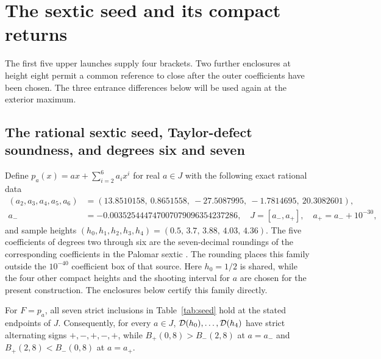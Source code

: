 \section{The sextic seed and its compact returns}\label{sec:deg12}

The first five upper launches supply four brackets. Two further enclosures at height eight permit a common reference to close after the outer coefficients have been chosen. The three entrance differences below will be used again at the exterior maximum.

\subsection{The rational sextic seed, Taylor-defect soundness, and degrees six and seven}\label{subsec:seed}
Define $p_a(x)=ax+\sum_{i=2}^6 a_i x^i$ for real $a\in J$ with the following exact rational data
\begin{equation}\label{eq:seed-coeffs}
  \begin{aligned}
    (a_2,a_3,a_4,a_5,a_6) &= (13.8510158,\ 0.8651558,\ -27.5087995,\ -1.7814695,\ 20.3082601),\\
    a_- &= -0.003525444747007079096354237286,\quad J=[a_-,a_+],\quad a_+=a_-+10^{-30},
  \end{aligned}
\end{equation}
and sample heights $(h_0,h_1,h_2,h_3,h_4)=(0.5,\,3.7,\,3.88,\,4.03,\,4.36)$.
The five coefficients of degrees two through six are the seven-decimal
roundings of the corresponding coefficients in the Palomar sextic
\cite[Theorem~1 and Appendix~A]{Palomar2026}.
The rounding places this family outside the $10^{-40}$ coefficient box
of that source. Here $h_0=1/2$ is shared, while the four other compact
heights and the shooting interval for $a$ are chosen for the present
construction. The enclosures below certify this family directly.

\begin{lemma}\label{lem:seed}
For $F=p_a$, all seven strict inclusions in Table~\ref{tab:seed} hold at the stated endpoints of $J$. Consequently, for every $a\in J$, $\mathcal{D}(h_0),\dots,\mathcal{D}(h_4)$ have strict alternating signs $+,-,+,-,+$, while $B_+(0,8)>B_-(2,8)$ at $a=a_-$ and $B_+(2,8)<B_-(0,8)$ at $a=a_+$.
\end{lemma}

